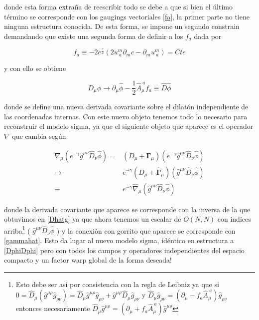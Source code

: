 \documentclass{article}
\numberwithin{equation}{section}
\begin{document}
donde esta forma extraña de reescribir todo se debe a que si bien el último término se corresponde con los gaugings vectoriales \ref{fa}, la primer parte no tiene ninguna estructura conocida. De esta forma, se impone un segundo constrain demandando que existe una segunda forma de definir a los $ f_a $ dada por

\begin{equation}
f_{a} \equiv -2e^{\frac{\gamma}{2}} \left( 2u^{m}_{\ a} \partial_{m}c - \partial_m u^{m}_{\ a} \right) = Cte
\end{equation}

y con ello se obtiene

\begin{equation}\label{hatDphi}
D_{\mu} \phi \longrightarrow  \partial_{\mu}\hat{\phi} - \frac{1}{2} \hat{A}_{\mu}^{\ a} f_{a} \equiv \hat{D}\hat{\phi}
\end{equation}

donde se define una nueva derivada covariante sobre el dilatón independiente de las coordenadas internas. Con este nuevo objeto tenemos todo lo necesario para reconstruir el modelo sigma, ya que el siguiente objeto que aparece es el operador $ \nabla $ que cambia según


\begin{equation}
\begin{aligned}
\nabla_{\mu} \left( e^{- \gamma} \hat{g}^{\mu \nu} \hat{D}_{\nu} \hat{\phi}\right) =& \left(D_{\mu} + \pmb{\Gamma}_{\mu}\right)\left( e^{- \gamma} \hat{g}^{\mu \nu} \hat{D}_{\nu} \hat{\phi}\right)\\
\longrightarrow& e^{- \gamma}\left( \hat{D}_{\mu} + \pmb{\hat{\Gamma}}_{\mu} \right) \left(\hat{g}^{\mu \nu} \hat{D}_{\nu} \hat{\phi}\right) \\
\equiv& e^{- \gamma} \hat{\nabla}_{\mu} \left(\hat{g}^{\mu \nu} \hat{D}_{\nu} \hat{\phi}\right)
\end{aligned}
\end{equation}

donde la derivada covariante que aparece se corresponde con la inversa de la que obtuvimos en \ref{Dhatg} ya que ahora tenemos un escalar de $ O(N,N) $ con indices arriba\footnote{ Esto debe ser así por consistencia con la regla de Leibniz ya que si $ 0 = \hat{D}_{\mu} (\hat{g}^{\mu \rho} \hat{g}_{\rho \nu}) = \hat{D}_{\mu}\hat{g}^{\mu \rho} \hat{g}_{\rho \nu} + \hat{g}^{\mu \rho} \hat{D}_{\mu} \hat{g}_{\rho \nu} $ y $ \hat{D}_{\mu} \hat{g}_{\rho \nu} = \left(\partial_{\mu} - f_{a} \hat{A}_{\mu}^{\ a}\right) \hat{g}_{\rho \nu} $ entonces necesariamente $  \hat{D}_{\mu}\hat{g}^{\mu \rho} = \left(\partial_{\mu} + f_{a} \hat{A}_{\mu}^{\ a}\right)\hat{g}^{\mu \rho} $ } ( $ \hat{g}^{\mu \nu} \hat{D}_{\nu} \hat{\phi} $ ) y la conexión con gorrito que aparece se corresponde con \ref{gammahat}. Esto da lugar al nuevo modelo sigma, idéntico en estructura a \ref{DphiDphi} pero con todos los campos y operadores independientes del espacio compacto y un factor warp global de la forma deseada!\\
\end{document}
